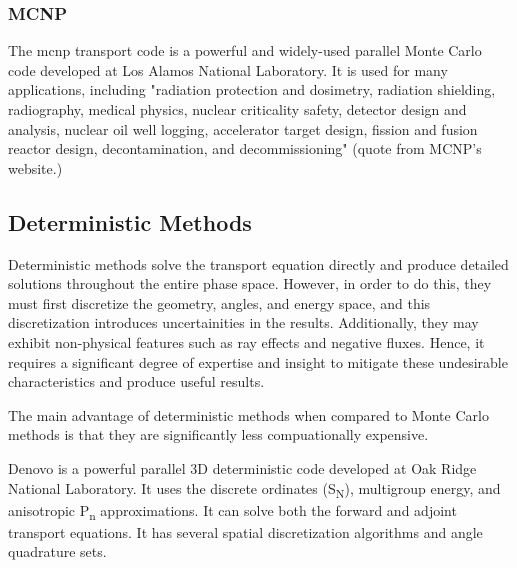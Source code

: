 \subsubsection{MCNP}
\label{sec:bg:rt:mc:MCNP}

The \ac{mcnp} transport code \cite{mcnp620} is a powerful and widely-used parallel Monte Carlo code developed at Los Alamos National Laboratory.
It is used for many applications, including "radiation protection and dosimetry, radiation shielding, radiography, medical physics, nuclear criticality safety, detector design and analysis, nuclear oil well logging, accelerator target design, fission and fusion reactor design, decontamination, and decommissioning" (quote from MCNP's website.)

\subsection{Deterministic Methods}
\label{sec:bg:rt:determ}

Deterministic methods solve the transport equation directly and produce detailed solutions throughout the entire phase space.
However, in order to do this, they must first discretize the geometry, angles, and energy space, and this discretization introduces uncertainities in the results.
Additionally, they may exhibit non-physical features such as ray effects and negative fluxes.
Hence, it requires a significant degree of expertise and insight to mitigate these undesirable characteristics and produce useful results.

The main advantage of deterministic methods when compared to Monte Carlo methods is that they are significantly less compuationally expensive.

Denovo \cite{denovo} is a powerful parallel 3D deterministic code developed at Oak Ridge National Laboratory.
It uses the discrete ordinates (S\textsubscript{N}), multigroup energy, and anisotropic P\textsubscript{n} approximations.
It can solve both the forward and adjoint transport equations.
It has several spatial discretization algorithms and angle quadrature sets.

